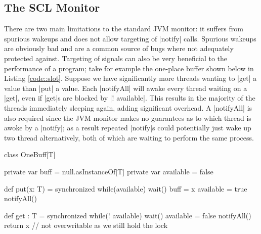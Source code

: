 \subsection{The SCL Monitor}
\inlineCSP

There are two main limitations to the standard JVM monitor: it suffers from spurious wakeups and does not allow targeting of |notify| calls. Spurious wakeups are obviously bad and are a common source of bugs where not adequately protected against. Targeting of signals can also be very beneficial to the performance of a program; take for example the one-place buffer shown below in Listing \ref{code::slot}. Suppose we have significantly more threads wanting to |get| a value than |put| a value. Each |notifyAll| will awake every thread waiting on a |get|, even if |get|s are blocked by |! available|. This results in the majority of the threads immediately sleeping again, adding significant overhead. A |notifyAll| is also required since the JVM monitor makes no guarantees as to which thread is awoke by a |notify|; as a result repeated |notify|s could potentially just wake up two thread alternatively, both of which are waiting to perform the same process.

\begin{scala}[label=code::slot, caption={Single placed buffer as an example of the inefficiency of untargeted signals}]
  class OneBuff[T] {
    private var buff = null.asInstanceOf[T]
    private var available = false

    def put(x: T) = synchronized {
      while(available) wait()
      buff = x
      available = true
      notifyAll()
    }

    def get : T = synchronized {
      while(! available) wait()
      available = false
      notifyAll()
      return x // not overwritable as we still hold the lock
    }
  }
\end{scala}

